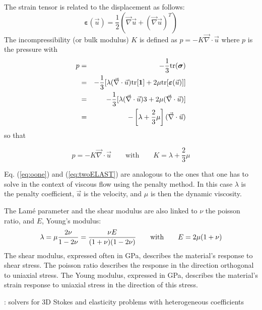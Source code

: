 The strain tensor is related to the displacement as follows: 
\[
{\bm \varepsilon}(\vec{u}) 
= \frac{1}{2}(\vec{\nabla}\vec{u} + (\vec{\nabla}\vec{u})^T)
\]
The incompressibility (or bulk modulus) $K$ is defined as $p=-K \vec{\nabla}\cdot\vec{u}$ 
where $p$ is the pressure with 
\begin{eqnarray}
p&=&-\frac{1}{3} \text{tr}({\bm \sigma}) \nonumber\\
 &=& -\frac{1}{3} [ \lambda (\vec{\nabla}\cdot\vec{u}) \text{tr}[{\bm 1}] + 2 \mu {\rm tr}[{\bm \varepsilon}(\vec{u})]] \nonumber\\
 &=& -\frac{1}{3} [ \lambda (\vec{\nabla}\cdot\vec{u})  3  + 2 \mu  (\vec{\nabla}\cdot\vec{u}) ] \nonumber\\
 &=& -\left[ \lambda + \frac{2}{3} \mu \right] (\vec{\nabla}\cdot\vec{u})  
\end{eqnarray}
so that 
\begin{mdframed}[backgroundcolor=blue!5]
\[
p=-K \vec{\nabla}\cdot\vec{u} 
\qquad
\text{with}
\qquad
K=\lambda+\frac{2}{3}\mu
\]
\end{mdframed}




\begin{remark}
Eq. (\ref{eq:oone}) and (\ref{eq:twoELAST}) are analogous to the ones that one has to solve
in the context of viscous flow using the penalty method. In this case $\lambda$ is the penalty coefficient, 
$\vec{u}$ is the velocity, and $\mu$ is then the dynamic viscosity.
\end{remark}

The Lam\'e parameter and the shear modulus are also linked to $\nu$ the poisson ratio, 
and $E$, Young's modulus:  
\[
\lambda=\mu\frac{2\nu}{1-2\nu}
=\frac{\nu E}{(1+\nu)(1-2\nu)}
\quad\quad
{\rm with}
\quad\quad
E=2\mu(1+\nu)
\]
The shear modulus, expressed often in GPa, describes the material's response to shear stress.
The poisson ratio describes the response in the direction orthogonal to uniaxial stress.
The Young modulus, expressed in GPa, describes the material's strain response to uniaxial stress in the 
direction of this stress.


\Literature: solvers for 3D Stokes and elasticity problems with
heterogeneous coefficients \cite{samb20}




\newpage
